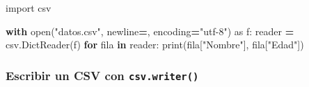 \documentclass[
]{book}
\newenvironment{Shaded}{\begin{snugshade}}{\end{snugshade}}
\newcommand{\BuiltInTok}[1]{#1}
\newcommand{\ControlFlowTok}[1]{\textcolor[rgb]{0.13,0.29,0.53}{\textbf{#1}}}
\newcommand{\ImportTok}[1]{#1}
\newcommand{\KeywordTok}[1]{\textcolor[rgb]{0.13,0.29,0.53}{\textbf{#1}}}
\newcommand{\NormalTok}[1]{#1}
\newcommand{\OperatorTok}[1]{\textcolor[rgb]{0.81,0.36,0.00}{\textbf{#1}}}
\newcommand{\StringTok}[1]{\textcolor[rgb]{0.31,0.60,0.02}{#1}}
\theoremstyle{break}
\theoremstyle{nonumberplain}
\begin{document}
\begin{Shaded}
\begin{Highlighting}[]
\ImportTok{import}\NormalTok{ csv}

\ControlFlowTok{with} \BuiltInTok{open}\NormalTok{(}\StringTok{"datos.csv"}\NormalTok{, newline}\OperatorTok{=}\StringTok{\textquotesingle{}\textquotesingle{}}\NormalTok{, encoding}\OperatorTok{=}\StringTok{"utf{-}8"}\NormalTok{) }\ImportTok{as}\NormalTok{ f:}
\NormalTok{    reader }\OperatorTok{=}\NormalTok{ csv.DictReader(f)}
    \ControlFlowTok{for}\NormalTok{ fila }\KeywordTok{in}\NormalTok{ reader:}
        \BuiltInTok{print}\NormalTok{(fila[}\StringTok{"Nombre"}\NormalTok{], fila[}\StringTok{"Edad"}\NormalTok{])}
\end{Highlighting}
\end{Shaded}

\subsubsection{\texorpdfstring{Escribir un CSV con \texttt{csv.writer()}}{Escribir un CSV con csv.writer()}}\label{escribir-un-csv-con-csv.writer}
\end{document}
